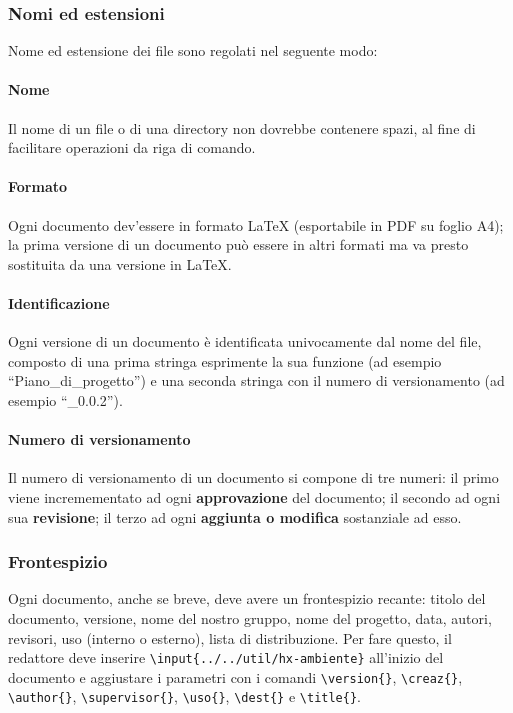 \subsubsection{Nomi ed estensioni} Nome ed estensione dei file sono regolati nel seguente modo:
\paragraph{Nome} Il nome di un file o di una directory non dovrebbe contenere spazi, al fine di facilitare operazioni da riga di comando.
\paragraph{Formato} Ogni documento dev'essere in formato \LaTeX{} (esportabile in PDF su foglio A4); la prima versione di un documento può essere in altri formati ma va presto sostituita da una versione in \LaTeX.
\paragraph{Identificazione} Ogni versione di un documento è identificata univocamente dal nome del file, composto di una prima stringa esprimente la sua funzione (ad esempio “Piano\_di\_progetto”) e una seconda stringa con il numero di versionamento (ad esempio “\_0.0.2”).
\paragraph{Numero di versionamento} Il numero di versionamento di un documento si compone di tre numeri: il primo viene incremementato ad ogni \textbf{approvazione} del documento; il secondo ad ogni sua \textbf{revisione}; il terzo ad ogni \textbf{aggiunta o modifica} sostanziale ad esso.

\subsubsection{Frontespizio} Ogni documento, anche se breve, deve avere un frontespizio recante: titolo del documento, versione, nome del nostro gruppo, nome del progetto, data, autori, revisori, uso (interno o esterno), lista di distribuzione. Per fare questo, il redattore deve inserire \texttt{\textbackslash input\{../../util/hx-ambiente\}} all'inizio del documento e aggiustare i parametri con i comandi \texttt{\textbackslash version\{\}}, \texttt{\textbackslash creaz\{\}}, \texttt{\textbackslash author\{\}}, \texttt{\textbackslash supervisor\{\}}, \texttt{\textbackslash uso\{\}}, \texttt{\textbackslash dest\{\}} e \texttt{\textbackslash title\{\}}.

